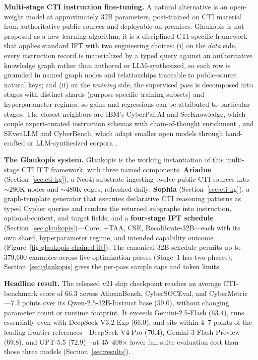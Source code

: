 \documentclass[conference]{IEEEtran}
\begin{document}
\textbf{Multi-stage CTI instruction fine-tuning.} A natural alternative is an open-weight model at approximately 32B parameters, post-trained on CTI material from authoritative public sources and deployable on-premises. Glaukopis is not proposed as a new learning algorithm; it is a disciplined CTI-specific framework that applies standard IFT \cite{wei2022flan,ouyang2022instructgpt,chung2022flant5} with two engineering choices: (i) on the \emph{data} side, every instruction record is materialized by a typed query against an authoritative knowledge graph rather than authored or LLM-synthesized, so each row is grounded in named graph nodes and relationships traceable to public-source natural keys; and (ii) on the \emph{training} side, the supervised pass is decomposed into stages with distinct shards (purpose-specific training subsets) and hyperparameter regimes, so gains and regressions can be attributed to particular stages. The closest neighbors are IBM's CyberPal.AI and SecKnowledge, which couple expert-curated instruction schemas with chain-of-thought enrichment \cite{levi2024cyberpal,levi2025toward}, and SEvenLLM and CyberBench, which adapt smaller open models through hand-crafted or LLM-synthesized corpora \cite{ji2024sevenllm,liu2024cyberbench}.

\textbf{The Glaukopis system.} Glaukopis is the working instantiation of this multi-stage CTI IFT framework, with three named components: \textbf{Ariadne} (Section~\ref{sec:cti-kg}), a Neo4j substrate ingesting twelve public CTI sources into ${\sim}280$K nodes and ${\sim}480$K edges, refreshed daily; \textbf{Sophia} (Section~\ref{sec:cti-kg}), a graph-template generator that executes declarative CTI reasoning patterns as typed Cypher queries and renders the returned subgraphs into instruction, optional-context, and target fields; and a \textbf{four-stage IFT schedule} (Section~\ref{sec:glaukopis})---Core, +TAA, CSE, Recalibrate-32B---each with its own shard, hyperparameter regime, and intended capability outcome (Figure~\ref{fig:glaukopis-chained-ift}). The canonical 32B schedule permits up to 379,600 examples across five optimization passes (Stage~1 has two phases); Section~\ref{sec:glaukopis} gives the per-pass sample caps and token limits.

\textbf{Headline result.} The released v21 ship checkpoint \cite{glaukopis2026model} reaches an average CTI-benchmark score of 66.3 across AthenaBench, CyberSOCEval, and CyberMetric---7.3 points over its Qwen-2.5-32B-Instruct base (59.0), without changing parameter count or runtime footprint. It exceeds Gemini-2.5-Flash (63.4), runs essentially even with DeepSeek-V3.2-Exp (66.0), and sits within 4--7 points of the leading frontier references---DeepSeek-V4-Pro (70.4), Gemini-3-Flash-Preview (69.8), and GPT-5.5 (72.9)---at 45--408$\times$ lower full-suite evaluation cost than those three models (Section~\ref{sec:results}).
\end{document}
